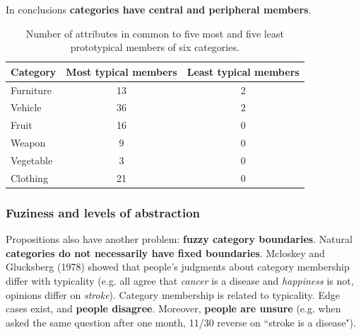 In conclusions \textbf{categories have central and peripheral members}.


\begin{table}[h]
    \centering
    \captionsetup{width=.8\linewidth}
    \begin{tabular}{lcc}
        \hline
        Category & Most typical members & Least typical members \\
        \hline
        Furniture & 13 & 2 \\
        Vehicle & 36 & 2 \\
        Fruit & 16 & 0 \\
        Weapon & 9 & 0 \\
        Vegetable & 3 & 0 \\
        Clothing & 21 & 0 \\
        \hline
    \end{tabular}
    \caption{Number of attributes in common to five most and five least prototypical members of six categories.}
    \label{tab:rosch}
\end{table}

\subsubsection{Fuziness and levels of abstraction}
Propositions also have another problem: \textbf{fuzzy category boundaries}. Natural \textbf{categories do not necessarily have fixed boundaries}.
Mcloskey and Glucksberg (1978) showed that people’s judgments about category membership differ with typicality (e.g. all agree that \textit{cancer} is a disease and \textit{happiness} is not, opinions differ on \textit{stroke}). Category membership is related to typicality. Edge cases exist, and \textbf{people disagree}. Moreover, \textbf{people are unsure} (e.g. when asked the same question after one month, 11/30 reverse on ``stroke is a disease").\\

